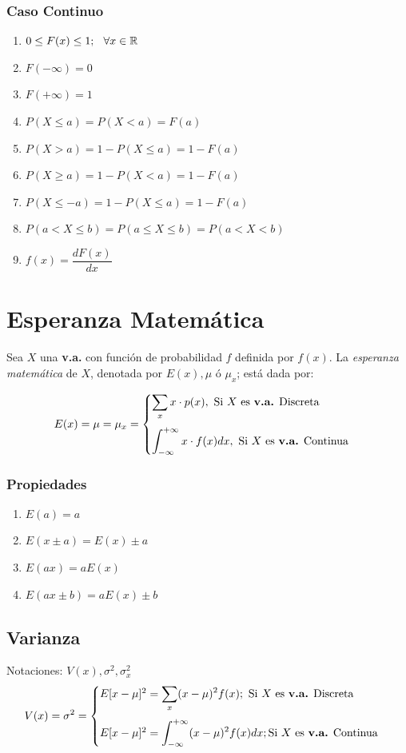 \subsubsection{Caso Continuo}
\begin{enumerate}
\item $0\leq F(x) \leq 1; \hspace{0.25cm}\forall x\in\mathbb{R}$
\item $F(-\infty)=0$
\item $F(+\infty)=1$
\item $P(X\leq a)=P(X<a)=F(a)$
\item $P(X>a)=1-P(X\leq a)=1-F(a)$
\item $P(X\geq a)=1-P(X<a)=1-F(a)$
\item $P(X\leq -a)=1-P(X\leq a)=1-F(a)$
\item $P(a<X\leq b)=P(a\leq X\leq b)=P(a<X<b)$
\item $f(x)=\dfrac{d F(x)}{dx}$
\end{enumerate}
\section{Esperanza Matemática}
Sea $X$ una \textbf{v.a.} con función de probabilidad $f$ definida por $f(x)$. La \textit{esperanza matemática} de $X$, denotada por $E(x),\mu$ ó $\mu_x$; está dada por:

$$
E(x)=\mu =\mu_x =
\begin{cases}
\displaystyle\sum_{x} x\cdot p(x), \text{ Si $X$ es \textbf{v.a.} Discreta}\vspace{0.25cm}\\
\displaystyle\int_{-\infty}^{+\infty} x\cdot f(x) dx, \text{ Si $X$ es \textbf{v.a.} Continua}
\end{cases}
$$
\subsubsection{Propiedades}
\begin{enumerate}
\item $E(a)=a$
\item $E(x\pm a)=E(x)\pm a$
\item $E(ax)=aE(x)$
\item $E(ax\pm b)=aE(x)\pm b$
\end{enumerate}
\subsection{Varianza}
Notaciones: $V(x),\sigma^2,\sigma_{x}^{2}$
$$
V(x)=\sigma^2 =
\begin{cases}
E[x-\mu]^2 = \displaystyle\sum_{x} (x-\mu)^2 f(x); \text{ Si $X$ es \textbf{v.a.} Discreta}\vspace{0.25cm}\\
E[x-\mu]^2 = \displaystyle\int_{-\infty}^{+\infty} (x-\mu)^2 f(x)dx; \text{Si $X$ es \textbf{v.a.} Continua}
\end{cases}
$$
